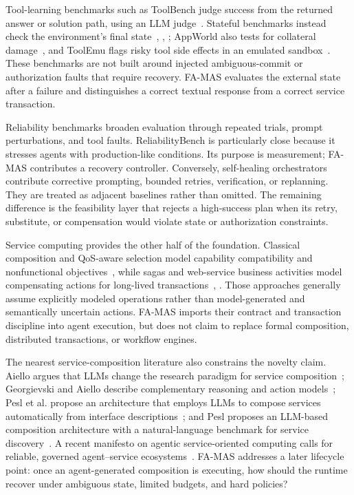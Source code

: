 \documentclass[10pt,journal,compsoc]{IEEEtran}
\newcommand{\famas}{FA-MAS}
\begin{document}
Tool-learning benchmarks such as ToolBench judge success from the returned answer or solution path, using an LLM judge~\cite{qin2024toolllm}. Stateful benchmarks instead check the environment's final state~\cite{yao2025taubench}, \cite{barres2026tau2}, \cite{lu2025toolsandbox}; AppWorld also tests for collateral damage~\cite{trivedi2024appworld}, and ToolEmu flags risky tool side effects in an emulated sandbox~\cite{ruan2024toolemu}. These benchmarks are not built around injected ambiguous-commit or authorization faults that require recovery. \famas{} evaluates the external state after a failure and distinguishes a correct textual response from a correct service transaction.

Reliability benchmarks broaden evaluation through repeated trials, prompt perturbations, and tool faults. ReliabilityBench is particularly close because it stresses agents with production-like conditions. Its purpose is measurement; \famas{} contributes a recovery controller. Conversely, self-healing orchestrators contribute corrective prompting, bounded retries, verification, or replanning. They are treated as adjacent baselines rather than omitted. The remaining difference is the feasibility layer that rejects a high-success plan when its retry, substitute, or compensation would violate state or authorization constraints.

Service computing provides the other half of the foundation. Classical composition and QoS-aware selection model capability compatibility and nonfunctional objectives~\cite{zeng2004qos}, while sagas and web-service business activities model compensating actions for long-lived transactions~\cite{garcia1987sagas}, \cite{wsba2009}. Those approaches generally assume explicitly modeled operations rather than model-generated and semantically uncertain actions. \famas{} imports their contract and transaction discipline into agent execution, but does not claim to replace formal composition, distributed transactions, or workflow engines.

The nearest service-composition literature also constrains the novelty claim. Aiello argues that LLMs change the research paradigm for service composition~\cite{aiello2025paradigm}; Georgievski and Aiello describe complementary reasoning and action models~\cite{georgievski2025lram}; Pesl et al. propose an architecture that employs LLMs to compose services automatically from interface descriptions~\cite{pesl2024compositio}; and Pesl proposes an LLM-based composition architecture with a natural-language benchmark for service discovery~\cite{pesl2025adopting}. A recent manifesto on agentic service-oriented computing calls for reliable, governed agent--service ecosystems~\cite{beheshti2026manifesto}. \famas{} addresses a later lifecycle point: once an agent-generated composition is executing, how should the runtime recover under ambiguous state, limited budgets, and hard policies?
\end{document}
